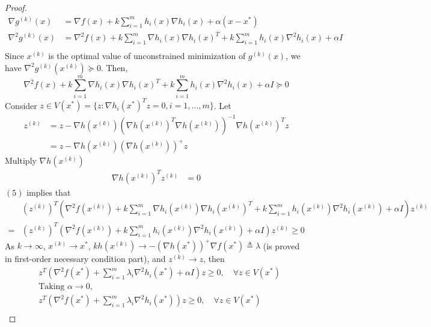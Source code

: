 \documentclass[11pt,a4paper]{article}
\begin{document}
\begin{proof}
\begin{equation}
    \begin{aligned}
        \nabla g^{(k)}(x)&=\nabla f(x)+k\sum_{i=1}^m h_i(x) \nabla h_i(x)+\alpha(x-x^*)\\
        \nabla^2 g^{(k)}(x)&=\nabla^2 f(x)+k\sum_{i=1}^m \nabla h_i(x) \nabla h_i(x)^T+k\sum_{i=1}^m h_i(x) \nabla^2 h_i(x)+\alpha I\\
    \end{aligned}
    \nonumber
\end{equation}
Since $x^{(k)}$ is the optimal value of unconstrained minimization of $g^{(k)}(x)$, we have $\nabla^2 g^{(k)}(x^{(k)})\succeq 0$. Then,
\begin{equation}
    \nabla^2 f(x)+k\sum_{i=1}^m \nabla h_i(x) \nabla h_i(x)^T+k\sum_{i=1}^m h_i(x) \nabla^2 h_i(x)+\alpha I\succeq 0
\end{equation}
Consider $z\in V(x^*)=\{z:\nabla h_i(x^*)^Tz=0,i=1,...,m\}$. Let
\begin{equation}
    \begin{aligned}
        z^{(k)}&=z-\nabla h(x^{(k)})\left(\nabla h(x^{(k)})^T\nabla h(x^{(k)})\right)^{-1}\nabla h(x^{(k)})^Tz\\
        &=z-\nabla h(x^{(k)})\left(\nabla h(x^{(k)})\right)^+z
    \end{aligned}
    \nonumber
\end{equation}
Multiply $\nabla h(x^{(k)})$
\begin{equation}
    \begin{aligned}
        \nabla h(x^{(k)})^Tz^{(k)}&=0
    \end{aligned}
    \nonumber
\end{equation}
$(5)$ implies that
\begin{equation}
    \begin{aligned}
        &(z^{(k)})^T\left(\nabla^2 f(x^{(k)})+k\sum_{i=1}^m \nabla h_i(x^{(k)}) \nabla h_i(x^{(k)})^T+k\sum_{i=1}^m h_i(x^{(k)}) \nabla^2 h_i(x^{(k)})+\alpha I\right)z^{(k)}\\
        =&(z^{(k)})^T\left(\nabla^2 f(x^{(k)})+k\sum_{i=1}^m h_i(x^{(k)}) \nabla^2 h_i(x^{(k)})+\alpha I\right)z^{(k)}\geq 0
    \end{aligned}
    \nonumber
\end{equation}
As $k \rightarrow \infty$, $x^{(k)} \rightarrow	x^*$, $kh(x^{(k)})\rightarrow-\left(\nabla h(x^{*})\right)^+\nabla f(x^{*})\triangleq \lambda$ (is proved in first-order necessary condition part), and $z^{(k)}\rightarrow	z$, then
\begin{equation}
    \begin{aligned}
        &z^T\left(\nabla^2 f(x^*)+\sum_{i=1}^m\lambda_i \nabla^2 h_i(x^*)+\alpha I\right)z\geq 0,\quad \forall z\in V(x^*)\\
        &\text{Taking }\alpha \rightarrow 0,\\
        &z^T\left(\nabla^2 f(x^*)+\sum_{i=1}^m\lambda_i \nabla^2 h_i(x^*)\right)z\geq 0,\quad \forall z\in V(x^*)\\
    \end{aligned}
    \nonumber
\end{equation}
\end{proof}
\end{document}
